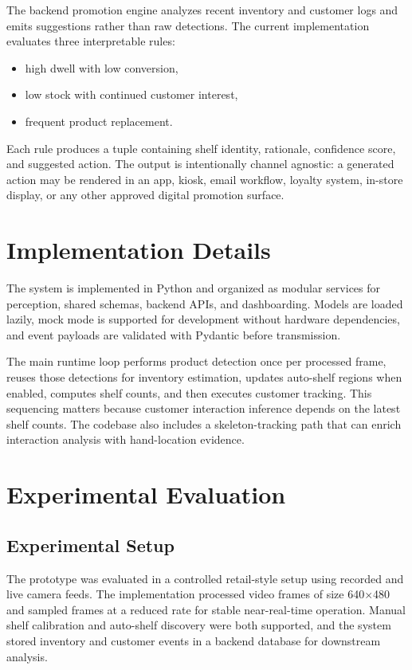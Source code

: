 \documentclass[conference]{IEEEtran}
\begin{document}
The backend promotion engine analyzes recent inventory and customer logs and emits suggestions rather than raw detections. The current implementation evaluates three interpretable rules:
\begin{itemize}
    \item high dwell with low conversion,
    \item low stock with continued customer interest,
    \item frequent product replacement.
\end{itemize}

Each rule produces a tuple containing shelf identity, rationale, confidence score, and suggested action. The output is intentionally channel agnostic: a generated action may be rendered in an app, kiosk, email workflow, loyalty system, in-store display, or any other approved digital promotion surface.

\section{Implementation Details}

The system is implemented in Python and organized as modular services for perception, shared schemas, backend APIs, and dashboarding. Models are loaded lazily, mock mode is supported for development without hardware dependencies, and event payloads are validated with Pydantic before transmission.



The main runtime loop performs product detection once per processed frame, reuses those detections for inventory estimation, updates auto-shelf regions when enabled, computes shelf counts, and then executes customer tracking. This sequencing matters because customer interaction inference depends on the latest shelf counts. The codebase also includes a skeleton-tracking path that can enrich interaction analysis with hand-location evidence.

\section{Experimental Evaluation}

\subsection{Experimental Setup}

The prototype was evaluated in a controlled retail-style setup using recorded and live camera feeds. The implementation processed video frames of size 640$\times$480 and sampled frames at a reduced rate for stable near-real-time operation. Manual shelf calibration and auto-shelf discovery were both supported, and the system stored inventory and customer events in a backend database for downstream analysis.
\end{document}
